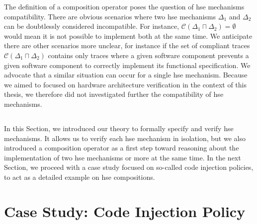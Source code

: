 The definition of a composition operator poses the question of \ac{hse}
mechanisms compatibility.
%
There are obvious scenarios where two \ac{hse} mechanisms \( \Delta_1 \) and
\( \Delta_2 \) can be doubtlessly considered incompatible.
%
For instance, \( \mathcal{C}(\Delta_1 \sqcap \Delta_2) = \emptyset \) would mean
it is not possible to implement both at the same time.
%
We anticipate there are other scenarios more unclear, for instance if the set of
compliant traces \( \mathcal{C}(\Delta_1 \sqcap \Delta_2) \) contains only
traces where a given software component prevents a given  software component to
correctly implement its functional specification. 
%
We advocate that a similar situation can occur for a single \ac{hse} mechanism.
%
Because we aimed to focused on hardware architecture verification in the context
of this thesis, we therefore did not investigated further the compatibility of \ac{hse} mechanisms.

\subsection*{}

In this Section, we introduced our theory to formally specify and verify
\ac{hse} mechanisms.
%
It allows us to verify each \ac{hse} mechanism in isolation, but we also
introduced a composition operator as a first step toward reasoning about the
implementation of two \ac{hse} mechanisms or more at the same time.
%
In the next Section, we proceed with a case study focused on so-called code
injection policies, to act as a detailed example on \ac{hse} compositions.


\section{Case Study: Code Injection Policy}
\label{sec:speccert:casestudy}

